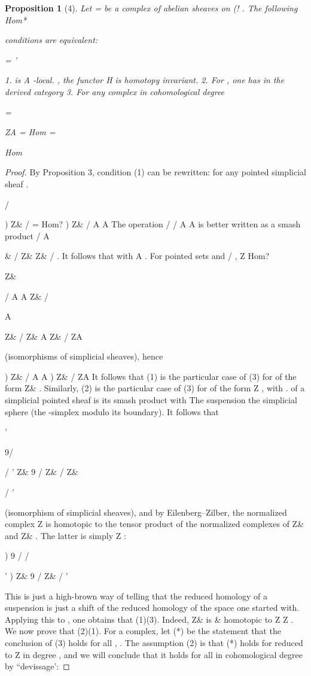 \documentclass[11pt,a4paper]{article}
\theoremstyle{plain}
\newtheorem{proposition}[theorem]{Proposition}
\theoremstyle{definition}
\begin{document}
\begin{proposition}[4]
Let = be a complex of abelian sheaves on (! . The following
Hom*

conditions are equivalent:

=
' 

1.
is A -local.
, the functor  H
is homotopy invariant.
2. For
, one has in the derived category
3. For any complex in cohomological degree



 =



  ZA =  Hom  =

Hom



\end{proposition}

\begin{proof} By Proposition 3, condition (1) can be rewritten: for any pointed simplicial
sheaf .

/

) Z\& /  = Hom? ) Z\& /  A  A 
The operation /  /  A   A is better written as a smash product /
A

\&  /  Z\&   Z\& / . It follows that
with A . For pointed sets  and / , Z
Hom?

Z\&

/  A  A Z\& /

A

 Z\& /   Z\& A  Z\& /   ZA

(isomorphisms of simplicial sheaves), hence

) Z\& /  A  A  ) Z\& /   ZA 
It follows that (1) is the particular case of (3) for of the form Z\&
. Similarly, (2)
is the particular case of (3) for of the form Z
, with  .
of a simplicial pointed sheaf
is its smash product with
The suspension 
the simplicial sphere  (the -simplex modulo its boundary). It follows that

'

9/


/
'
Z\& 9 /  Z\& /   Z\&   

/ 
' 

(isomorphism of simplicial sheaves), and by Eilenberg--Zilber, the normalized complex Z 
is homotopic to the tensor product of the normalized complexes of
Z\&
and Z\&  . The latter is simply Z :

) 9 / 
/ 
 

'
) Z\& 9 /   Z\& / '

This is just a high-brown way of telling that the reduced homology of a suspension
is just a shift of the reduced homology of the space one started with.
Applying this to
, one obtains that (1)(3). Indeed, Z\& 
is
\&
homotopic to Z
Z
.
We now prove that (2)(1). For a complex, let (*) be the statement that the
conclusion of (3) holds for all
,  . The assumption (2) is that (*) holds
for reduced to Z
in degree , and we will conclude that it holds for all in
cohomological degree
by ``devissage':


\end{proof}
\end{document}
